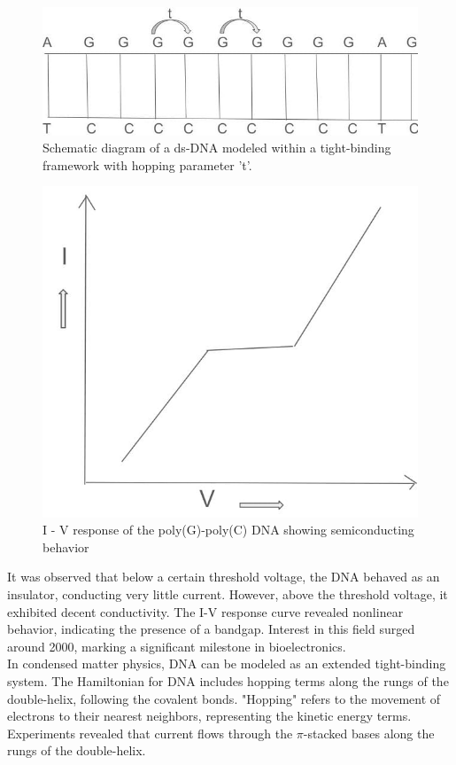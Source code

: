 \documentclass{article}
\begin{document}
\begin{figure}
    \centering
    \includegraphics[width=1\linewidth]{WhatsApp Image 2025-01-23 at 17.19.59.jpeg}
    \caption{Schematic diagram of a ds-DNA modeled within a tight-binding framework with hopping parameter 't'.}
    \label{fig:enter-label}
\end{figure}

\begin{figure}
    \centering
    \includegraphics[width=0.5\linewidth]{WhatsApp Image 2025-01-16 at 20.30.30.jpeg}
    \caption{I - V response of the poly(G)-poly(C) DNA showing semiconducting behavior}
    \label{fig:enter-label}
\end{figure}

It was observed that below a certain threshold voltage, the DNA behaved as an insulator, conducting very little current. However, above the threshold voltage, it exhibited decent conductivity. The I-V response curve revealed nonlinear behavior, indicating the presence of a bandgap. Interest in this field surged around 2000, marking a significant milestone in bioelectronics.\\

In condensed matter physics, DNA can be modeled as an extended tight-binding system. The Hamiltonian for DNA includes hopping terms along the rungs of the double-helix, following the covalent bonds. "Hopping" refers to the movement of electrons to their nearest neighbors, representing the kinetic energy terms. Experiments revealed that current flows through the $\pi$-stacked bases along the rungs of the double-helix.\\
\end{document}
